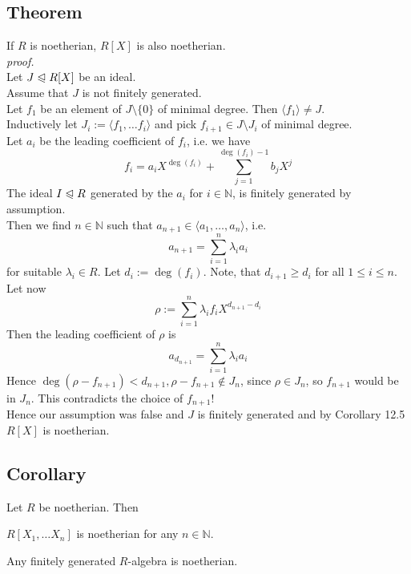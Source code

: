 \documentclass[12pt]{book}
\begin{document}
\begin{spacing}{1.3}
\subsection{Theorem } %
\titleformat{\subsection}{\normalfont\normalsize\bfseries}{}{0em}{#1 \thesubsection}
If $R$ is noetherian, $R[X]$ is also noetherian.\\
\textit{proof.}\\
Let $J \trianglelefteqslant R[X]$ be an ideal.\\
Assume that $J$ is not finitely generated.\\
Let $f_1$ be an element of $J \setminus \{0\}$ of minimal degree. Then $\langle f_1 \rangle \neq J$.\\
Inductively let $J_i:= \langle f_1, \ldots f_i \rangle$ and pick $f_{i+1} \in J \setminus J_{i}$ of minimal degree.\\
Let $a_i$ be the leading coefficient of $f_i$, i.e. we have
$$f_i = a_i X^{\deg(f_i)} + \sum_{j=1}^{\deg(f_i)-1} b_j X^{j}$$
The ideal $I \trianglelefteqslant R$ generated by the $a_i$ for $i \in \mathbb{N}$, is finitely generated by assumption.\\
Then we find $n \in \mathbb{N}$ such that $a_{n+1} \in \langle a_1, \ldots, a_n \rangle$, i.e.
$$a_{n+1}=\sum_{i=1}^n \lambda_i a_i$$
for suitable $\lambda_i \in R$. Let $d_i := \deg(f_i)$. Note, that $d_{i+1}\geqslant d_i$ for all $1 \leqslant i \leqslant n$.
Let now
$$\rho:= \sum_{i=1}^n \lambda_i f_i X^{d_{n+1}-d_i}$$
Then the leading coefficient of $\rho$ is 
$$a_{d_{n+1}}=\sum_{i=1}^n \lambda_i a_i$$
Hence $\deg(\rho-f_{n+1}) < d_{n+1}, \rho-f_{n+1} \notin J_n$, since $\rho \in J_n$, so $f_{n+1}$ would be in $J_n$. This contradicts the choice of $f_{n+1}$!\\
Hence our assumption was false and $J$ is finitely generated and by Corollary 12.5 $R[X]$ is noetherian.

\subsection{Corollary} %
Let $R$ be noetherian. Then 
\begin{compactenum}
\item $R[X_1, \ldots X_n]$ is noetherian for any $n \in \mathbb{N}$. 
\item Any finitely generated $R$-algebra is noetherian.
\end{compactenum}


\end{spacing}
\end{document}
